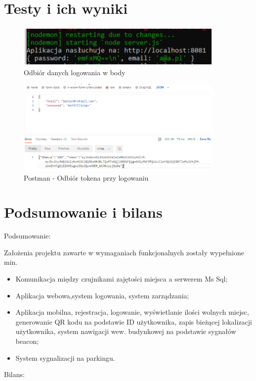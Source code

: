 \documentclass[12pt,a4paper]{article}
\begin{document}
\section{Testy i ich wyniki}
\begin{figure}[htb!p]
\begin{center}
\includegraphics[width=0.9\textwidth]{Przechwytywanie.png}
\caption{Odbiór danych logowania w body}
\end{center}
\end{figure}

\begin{figure}[htb!p]
\begin{center}
\includegraphics[width=0.9\textwidth]{Przechwytywanie1.png}
\caption{Postman - Odbiór tokena przy logowaniu}
\end{center}
\end{figure}

\section{Podsumowanie i bilans}
Podsumowanie:
\newline

Założenia projektu zawarte w wymaganiach funkcjonalnych zostały wypełnione min.
\begin{itemize}
\item Komunikacja między czujnikami zajętości miejsca a serwerem Ms Sql;
\item Aplikacja webowa,system logowania, system zarządzania;
\item Aplikacja mobilna, rejestracja, logowanie, wyświetlanie ilości wolnych miejsc,\\generowanie QR kodu na podstawie ID użytkownika, zapis bieżącej lokalizacji\\użytkownika, system nawigacji wew. budynkowej na podstawie sygnałów beacon;
\item System sygnalizacji na parkingu.
\end{itemize}
Bilans:
\newline
\end{document}
